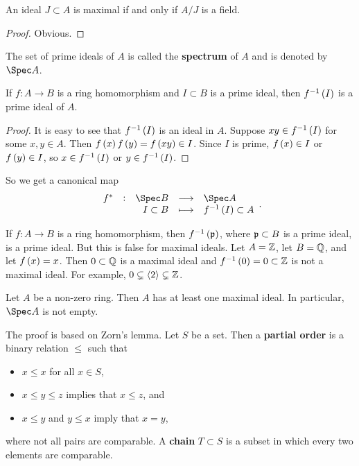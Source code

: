 \begin{lemma}
An ideal $ J \subset A $ is maximal if and only if $ A / J $ is a field.
\end{lemma}

\begin{proof}
Obvious.
\end{proof}

\begin{definition}
The set of prime ideals of $ A $ is called the \textbf{spectrum} of $ A $ and is denoted by $ \Spec A $.
\end{definition}

\begin{proposition}
If $ f : A \to B $ is a ring homomorphism and $ I \subset B $ is a prime ideal, then $ f^{-1}\br{I} $ is a prime ideal of $ A $.
\end{proposition}

\begin{proof}
It is easy to see that $ f^{-1}\br{I} $ is an ideal in $ A $. Suppose $ xy \in f^{-1}\br{I} $ for some $ x, y \in A $. Then $ f\br{x}f\br{y} = f\br{xy} \in I $. Since $ I $ is prime, $ f\br{x} \in I $ or $ f\br{y} \in I $, so $ x \in f^{-1}\br{I} $ or $ y \in f^{-1}\br{I} $.
\end{proof}

So we get a canonical map
$$ \function[f^*]{\Spec B}{\Spec A}{I \subset B}{f^{-1}\br{I} \subset A}. $$


\begin{remark}
If $ f : A \to B $ is a ring homomorphism, then $ f^{-1}\br{\ppp} $, where $ \mathfrak{p} \subset B $ is a prime ideal, is a prime ideal. But this is false for maximal ideals. Let $ A = \mathbb{Z} $, let $ B = \mathbb{Q} $, and let $ f\br{x} = x $. Then $ 0 \subset \mathbb{Q} $ is a maximal ideal and $ f^{-1}\br{0} = 0 \subset \ZZ $ is not a maximal ideal. For example, $ 0 \subsetneq \left\langle 2 \right\rangle \subsetneq \mathbb{Z} $.
\end{remark}

\begin{theorem}
\label{thm:4.6}
Let $ A $ be a non-zero ring. Then $ A $ has at least one maximal ideal. In particular, $ \Spec A $ is not empty.
\end{theorem}

The proof is based on Zorn's lemma. Let $ S $ be a set. Then a \textbf{partial order} is a binary relation $ \le $ such that
\begin{itemize}
\item $ x \le x $ for all $ x \in S $,
\item $ x \le y \le z $ implies that $ x \le z $, and
\item $ x \le y $ and $ y \le x $ imply that $ x = y $,
\end{itemize}
where not all pairs are comparable. A \textbf{chain} $ T \subset S $ is a subset in which every two elements are comparable.

